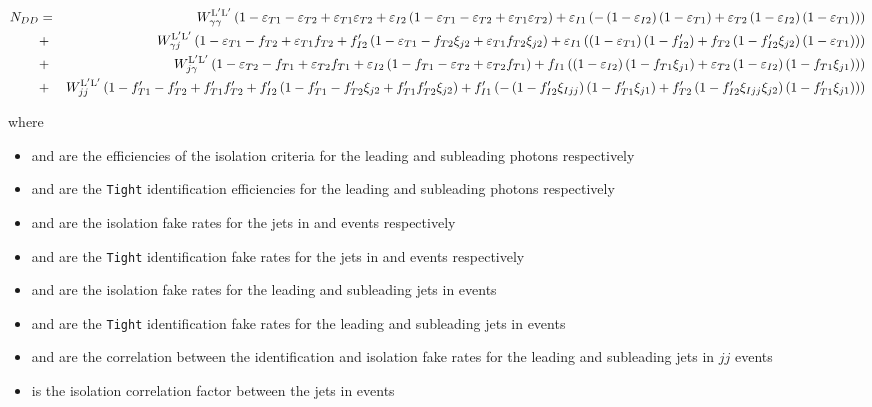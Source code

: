   {\tiny
  \begin{eqnarray}
    N_{DD} &=& W_{\gamma\gamma}^{\mathrm{L}^{\prime}\mathrm{L}^{\prime}} \left(1-\varepsilon_{T1}-\varepsilon_{T2}+\varepsilon_{T1} \varepsilon_{T2}  +\varepsilon_{I2} \left(1-\varepsilon_{T1}-\varepsilon_{T2}  +\varepsilon_{T1} \varepsilon_{T2}   \right)+\varepsilon_{I1} \left(-\left(1-\varepsilon_{I2}  \right) \left(1-\varepsilon_{T1}  \right)+\varepsilon_{T2} \left(1-\varepsilon_{I2}   \right) \left(1-\varepsilon_{T1}  \right)\right)\right)\nonumber \\
    &+& W_{\gamma j}^{\mathrm{L}^{\prime}\mathrm{L}^{\prime}}\left(1-\varepsilon_{T1}-f_{T2}+\varepsilon_{T1} f_{T2}  +f^{\prime}_{I2} \left(1-\varepsilon_{T1}-f_{T2}\xi_{j2}+\varepsilon_{T1} f_{T2} \xi_{j2}  \right)+\varepsilon_{I1} \left(\left(1-\varepsilon_{T1}  \right)\left(1-f^{\prime}_{I2}  \right)+f_{T2} \left(1-f^{\prime}_{I2}   \xi_{j2}\right) \left(1-\varepsilon_{T1}   \right)\right)\right) \nonumber \\
    &+& W_{j \gamma}^{\mathrm{L}^{\prime}\mathrm{L}^{\prime}}\left(1-\varepsilon_{T2}-f_{T1}+\varepsilon_{T2} f_{T1}  +\varepsilon_{I2} \left(1-f_{T1}-\varepsilon_{T2}  +\varepsilon_{T2} f_{T1}   \right)+f_{I1} \left(\left(1-\varepsilon_{I2}  \right) \left(1-f_{T1} \xi_{j1}\right)+\varepsilon_{T2} \left(1-\varepsilon_{I2}   \right) \left(1-f_{T1} \xi_{j1}  \right)\right)\right) \\
    &+& W_{jj}^{\mathrm{L}^{\prime}\mathrm{L}^{\prime}}\left(1-f^{\prime}_{T1}-f^{\prime}_{T2}+f^{\prime}_{T1} f^{\prime}_{T2}  +f^{\prime}_{I2} \left(1-f^{\prime}_{T1}-f^{\prime}_{T2} \xi_{j2}+f^{\prime}_{T1} f^{\prime}_{T2} \xi_{j2}  \right)+f^{\prime}_{I1} \left(-\left(1-f^{\prime}_{I2} \xi_{Ijj}\right) \left(1-f^{\prime}_{T1}\xi_{j1}\right)+f^{\prime}_{T2} \left(1-f^{\prime}_{I2} \xi_{Ijj} \xi_{j2}\right) \left(1-f^{\prime}_{T1} \xi_{j1}
    \right)\right)\right) \nonumber
  \end{eqnarray}
  }
  
  where
  \begin{itemize}
    \item \eIone and \eItwo are the efficiencies of the isolation criteria for the leading and subleading photons respectively
    \item \eTone and \eTtwo are the \texttt{Tight} identification efficiencies for the leading and subleading photons respectively
    \item \fIone and \fIptwo are the isolation fake rates for the jets in \yj and \jy events respectively
    \item \fTone and \fTtwo are the \texttt{Tight} identification fake rates for the jets in \yj and \jy events respectively
    \item \fIpone and \fIptwo are the isolation fake rates for the leading and subleading jets in \jj events
    \item \fTpone and \fTptwo are the \texttt{Tight} identification fake rates for the leading and subleading jets in \jj events
    \item \xijone and \xijtwo are the correlation between the identification and isolation fake rates for the leading and subleading jets in $jj$ events
    \item \xiIjj is the isolation correlation factor between the jets in \jj events
  \end{itemize}
  
